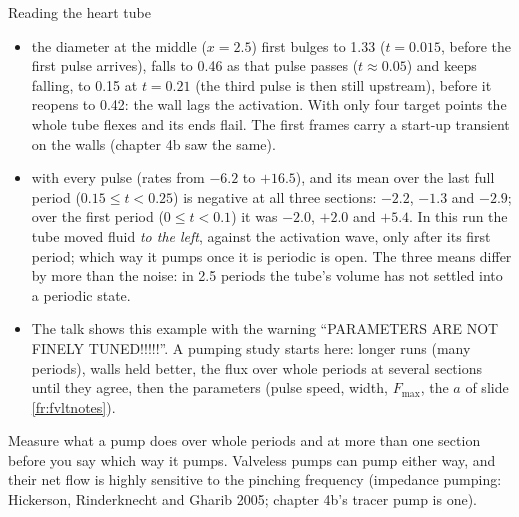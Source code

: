 \documentclass[aspectratio=169,11pt]{beamer}
\begin{document}
\begin{frame}{Reading the heart tube}
\label{fr:tuberead}
\footnotesize
\begin{itemize}
  \item {} the diameter at the middle ($x = 2.5$) first bulges to 1.33 ($t = 0.015$, before the first pulse arrives), falls to 0.46 as that pulse passes ($t \approx 0.05$) and keeps falling, to 0.15 at $t = 0.21$ (the third pulse is then still upstream), before it reopens to 0.42: the wall lags the activation. With only four target points the whole tube flexes and its ends flail. The first frames carry a start-up transient on the walls (chapter 4b saw the same).
  \item {} with every pulse (rates from $-6.2$ to $+16.5$), and its mean over the last full period ($0.15 \le t < 0.25$) is negative at all three sections: $-2.2$, $-1.3$ and $-2.9$; over the first period ($0 \le t < 0.1$) it was $-2.0$, $+2.0$ and $+5.4$. In this run the tube moved fluid \emph{to the left}, against the activation wave, only after its first period; which way it pumps once it is periodic is open. The three means differ by more than the noise: in 2.5 periods the tube's volume has not settled into a periodic state.
  \item The talk shows this example with the warning ``PARAMETERS ARE NOT FINELY TUNED!!!!!''. A pumping study starts here: longer runs (many periods), walls held better, the flux over whole periods at several sections until they agree, then the parameters (pulse speed, width, $F_{\max}$, the $a$ of slide \ref{fr:fvltnotes}).
\end{itemize}
\begin{punchbox}
\small Measure what a pump does over whole periods and at more than one section before you say which way it pumps. Valveless pumps can pump either way, and their net flow is highly sensitive to the pinching frequency (impedance pumping: Hickerson, Rinderknecht and Gharib 2005; chapter 4b's tracer pump is one).
\end{punchbox}
\end{frame}
\end{document}

